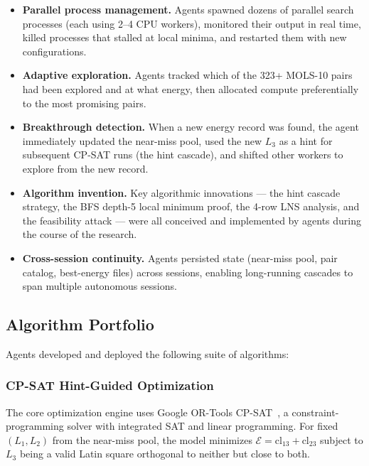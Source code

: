 \documentclass[11pt,a4paper]{article}
\theoremstyle{remark}
\newcommand{\cl}{\mathrm{cl}}
\newcommand{\E}{\mathcal{E}}
\begin{document}
\begin{itemize}
  \item \textbf{Parallel process management.} Agents spawned dozens of parallel search
    processes (each using 2--4 CPU workers), monitored their output in real time, killed
    processes that stalled at local minima, and restarted them with new configurations.

  \item \textbf{Adaptive exploration.} Agents tracked which of the 323+ MOLS-10 pairs had
    been explored and at what energy, then allocated compute preferentially to the most
    promising pairs.

  \item \textbf{Breakthrough detection.} When a new energy record was found, the agent
    immediately updated the near-miss pool, used the new $L_3$ as a hint for subsequent
    CP-SAT runs (the hint cascade), and shifted other workers to explore from the new record.

  \item \textbf{Algorithm invention.} Key algorithmic innovations --- the hint cascade
    strategy, the BFS depth-5 local minimum proof, the 4-row LNS analysis, and the
    feasibility attack --- were all conceived and implemented by agents during the course
    of the research.

  \item \textbf{Cross-session continuity.} Agents persisted state (near-miss pool, pair
    catalog, best-energy files) across sessions, enabling long-running cascades to span
    multiple autonomous sessions.
\end{itemize}

\subsection{Algorithm Portfolio}

Agents developed and deployed the following suite of algorithms:

\subsubsection{CP-SAT Hint-Guided Optimization}

The core optimization engine uses Google OR-Tools CP-SAT~\cite{ortools}, a
constraint-programming solver with integrated SAT and linear programming. For fixed
$(L_1, L_2)$ from the near-miss pool, the model minimizes $\E = \cl_{13} + \cl_{23}$
subject to $L_3$ being a valid Latin square orthogonal to neither but close to both.
\end{document}
